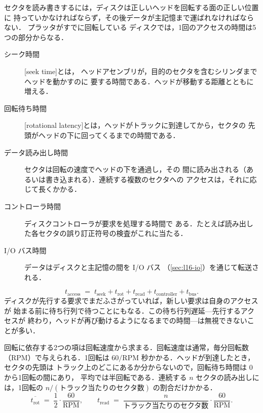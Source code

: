 \documentclass[../main.tex]{subfiles}
\begin{document}
セクタを読み書きするには，ディスクは正しいヘッドを回転する面の正しい位置に
持っていかなければならず，その後データが主記憶まで運ばれなければならない．
プラッタがすでに回転している
ディスクでは，1回のアクセスの時間は5つの部分からなる．
\begin{description}
  \item[シーク時間] [seek time]とは，
    ヘッドアセンブリが，目的のセクタを含むシリンダまでヘッドを動かすのに
    要する時間である．ヘッドが移動する距離とともに増える．
  \item[回転待ち時間] %
    [rotational latency]とは，ヘッドがトラックに到達してから，セクタの
    先頭がヘッドの下に回ってくるまでの時間である．
  \item[データ読み出し時間] セクタは回転の速度でヘッドの下を通過し，その
    間に読み出される（あるいは書き込まれる）．連続する複数のセクタへの
    アクセスは，それに応じて長くかかる．
  \item[コントローラ時間] ディスクコントローラが要求を処理する時間で
    ある．たとえば読み出した各セクタの誤り訂正符号の検査がこれに当たる．
  \item[I/O バス時間] データはディスクと主記憶の間を I/O バス
    （\cref{sec:l16-io}）を通じて転送される．
\end{description}
\begin{equation}
  t_{\text{access}} \;=\; t_{\text{seek}} + t_{\text{rot}} + t_{\text{read}}
    + t_{\text{controller}} + t_{\text{bus}} .
  \label{eq:l16-access}
\end{equation}
ディスクが先行する要求でまだふさがっていれば，新しい要求は自身のアクセスが
始まる前に待ち行列で待つことにもなる．この待ち行列遅延---先行するアクセスが
終わり，ヘッドが再び動けるようになるまでの時間---は無視できないことが多い．

回転に依存する2つの項は回転速度から求まる．回転速度は通常，毎分回転数
（RPM）で与えられる．1回転は $60/\text{RPM}$ 秒かかる．ヘッドが到達したとき，セクタの先頭は
トラック上のどこにあるか分からないので，回転待ち時間は 0 から1回転の間にあり，
平均では半回転である．連続する $n$ セクタの読み出しには，1回転の
$n/(\text{トラック当たりのセクタ数})$ の割合だけかかる．
\begin{equation}
  \overline{t_{\text{rot}}} \;=\; \frac{1}{2}\cdot\frac{60}{\text{RPM}} ,
  \qquad
  t_{\text{read}} \;=\; \frac{n}{\text{トラック当たりのセクタ数}}\cdot
    \frac{60}{\text{RPM}} .
  \label{eq:l16-rot}
\end{equation}
\end{document}
